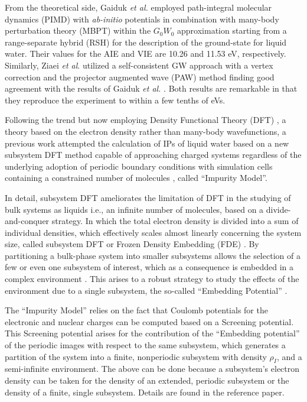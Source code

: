 \documentclass[notitlepage,12pt]{report}
\begin{document}
	From the theoretical side, Gaiduk \textit{et al.} \supercite{gaiduk2018electron} employed path-integral molecular dynamics (PIMD) with \textit{ab-initio} potentials in combination with many-body perturbation theory (MBPT) within the $G_{0}W_{0}$ approximation starting from a range-separate hybrid (RSH) for the description of the ground-state for liquid water. Their values for the AIE and VIE  are 10.26 and 11.53 eV, respectively.  Similarly, Ziaei \textit{et al}. \supercite{ziaei2018probing} utilized a self-consistent GW approach with a vertex correction and the projector augmented wave (PAW) method \supercite{dal2014pseudopotentials} finding  good agreement with the results of Gaiduk \textit{et al.} \supercite{gaiduk2018electron}. Both results are remarkable in that they reproduce the experiment to within a few tenths of eVs.
	
	Following the trend but now employing   Density Functional Theory (DFT) \supercite{thomas1927calculation,fermi1927statistical, hogenberg, kohn}, a theory based on the electron density rather than many-body wavefunctions, a previous work\supercite{tolle2019charged} attempted the calculation of IPs of liquid water based on a new subsystem DFT method\supercite{jacob2014subsystem,wesolowski2015frozen,krishtal2015subsystem} capable of approaching charged systems regardless of the underlying adoption of periodic boundary conditions with simulation cells containing a constrained number of molecules \supercite{tolle2019charged}, called “Impurity Model”. 
	
	In detail, subsystem DFT ameliorates the limitation of DFT in the studying of bulk systems as liquids i.e., an infinite number of molecules, based on a divide-and-conquer strategy. In which the total electron density is divided into a sum of individual densities, which effectively scales almost linearly concerning the system size, called subsystem DFT or Frozen Density Embedding (FDE) \supercite{mi2021eqe,mi2019nonlocal,mi2019ab}. By partitioning a bulk-phase system into smaller subsystems allows the selection of a few or even one subsystem of interest, which as a consequence is embedded in a complex environment \supercite{schmitt2020frozen}. This arises to a robust strategy to study the effects of the environment due to a single subsystem, the so-called “Embedding Potential” \supercite{genova2016avoiding}. 
	
	The “Impurity Model” relies on the fact that Coulomb potentials for the electronic and nuclear charges can be computed based on a Screening potential. This Screening potential arises for the contribution of the “Embedding potential” of the periodic images with respect to the same subsystem, which generates a partition of the system into a finite, nonperiodic subsystem with density $\rho_I$, and a semi-infinite environment. The above can be done because a subsystem’s electron density can be taken for the density of an extended, periodic subsystem or the density of a finite, single subsystem. Details are found in the reference paper\cite{tolle2019charged}. 
	
\end{document}
